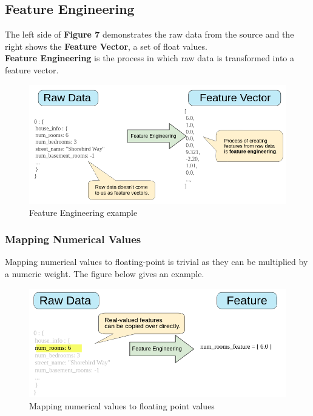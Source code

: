\documentclass[12pt]{article}
\begin{document}
\subsection{Feature Engineering}
The left side of \textbf{Figure 7} demonstrates the raw data from the source and the right shows the \textbf{Feature Vector}, a set of float values.
\\\textbf{Feature Engineering} is the process in which raw data is transformed into a feature vector.
\begin{figure}[h]
	\includegraphics[scale = 0.5]{imgs/RawToFeature.png}
	\centering
	\caption{Feature Engineering example}
\end{figure}

\subsubsection{Mapping Numerical Values}
Mapping numerical values to floating-point is trivial as they can be multiplied by a numeric weight. The figure below gives an example.
\begin{figure}[h]
	\includegraphics[scale = 0.5]{imgs/RawToIntFeature.png}
	\centering
	\caption{Mapping numerical values to floating point values}
\end{figure}
\end{document}
